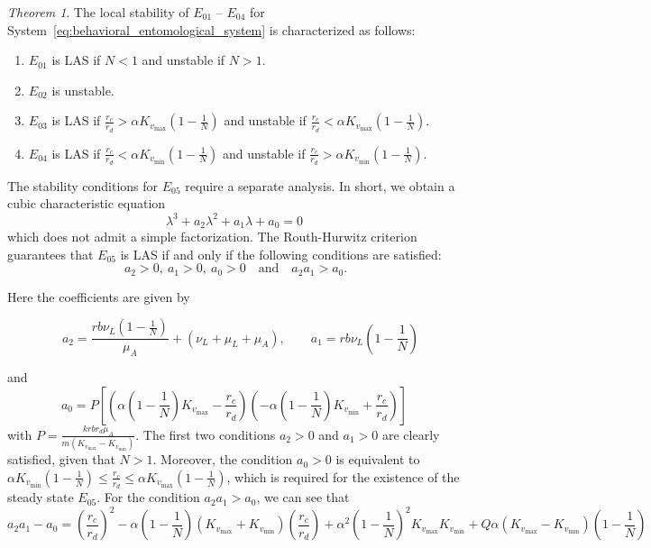 \documentclass{article}
\theoremstyle{remark}
\theoremstyle{custom} %
\newtheorem{theorem}{Theorem}
\begin{document}
\begin{theorem}\label{thm: Game-theoretic Model}
The local stability of $E_{01}$ -- $E_{04}$ for System~\eqref{eq:behavioral_entomological_system} is characterized as follows:
\begin{enumerate}
 \item \( E_{01} \) is LAS if \( N < 1 \) and unstable if \( N > 1 \).
    \item \( E_{02} \) is unstable.
    
    \item $E_{03}$ is LAS if  $\frac{r_c}{r_d} > \alpha K_{v_{\max}}\left(1 - \frac{1}{N}\right)$ and unstable if $\frac{r_c}{r_d} < \alpha K_{v_{\max}}\left(1 - \frac{1}{N}\right).$

    \item $E_{04}$ is LAS if  $\frac{r_c}{r_d} < \alpha K_{v_{\min}}\left(1 - \frac{1}{N}\right)$ and unstable if $\frac{r_c}{r_d} > \alpha K_{v_{\min}}\left(1 - \frac{1}{N}\right).$

    
    
\end{enumerate}
\end{theorem}


The stability conditions for \( E_{05} \) require a separate analysis. In short, we obtain a cubic characteristic equation 
\begin{equation}
\label{eq:cubic}
\lambda^3 + a_2 \lambda^2 + a_1 \lambda + a_0 = 0
\end{equation}
which does not admit a simple factorization. The Routh-Hurwitz criterion \cite{ogata2009modern}  guarantees that $E_{05}$ is LAS if and only if the following conditions are satisfied: 
\begin{equation*}
\ a_2 > 0, \ a_1 > 0, \ a_0 > 0 \quad \text{and} \quad  a_2 a_1 > a_0.
\end{equation*}

Here the coefficients are given by


$$\quad a_2=\frac{rb\nu_L \left(1-\frac{1}{N}\right)}{\mu_A}+\left(\nu_L+\mu_L+\mu_A\right), \qquad a_1=rb\nu_L\left(1-\frac{1}{N}\right) $$

and 
$$ a_0=P\left[\left(\alpha\left(1-\frac{1}{N}\right)K_{v_{\max }}-\frac{r_c}{r_d}\right)\left(-\alpha\left(1-\frac{1}{N}\right)K_{v_{\min }}+\frac{r_c}{r_d}\right)\right]$$ with $P=\frac{krbr_d\mu_A}{m\left(K_{v_{\max }}-K_{v_{\min }}\right)}$.  The first two conditions $a_2>0$ and $a_1>0$ are clearly satisfied, given that $N>1$. Moreover, the condition $a_0>0$ is equivalent to $\alpha K_{v_{\min }}\left(1-\frac{1}{N}\right) \leq \frac{r_c}{r_d} \leq \alpha K_{v_{\max }}\left(1-\frac{1}{N}\right)$, which is required for the existence of the steady state $E_{05}$. 
\color{black}
For the condition $a_2 a_1 > a_0$, we can see that 
\[
a_2 a_1 - a_0 = \left(\frac{r_c}{r_d}\right)^2 
- \alpha \left(1 - \frac{1}{N}\right) \left(K_{v_{\max}} + K_{v_{\min}}\right) \left(\frac{r_c}{r_d}\right) 
+ \alpha^2 \left(1 - \frac{1}{N}\right)^2 K_{v_{\max}} K_{v_{\min}} 
+ Q \alpha \left(K_{v_{\max}} - K_{v_{\min}}\right)\left(1 - \frac{1}{N}\right)
\]
\end{document}
